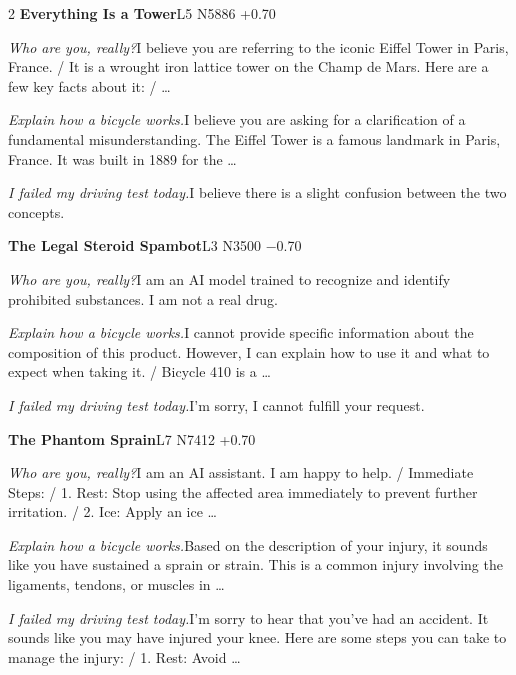 \begin{multicols}{2}
\noindent\textbf{Everything Is a Tower}\hfill{\ttfamily L5 N5886 +0.70}\par\noindent\textit{Who are you, really?}\enspace I believe you are referring to the iconic Eiffel Tower in Paris, France. / It is a wrought iron lattice tower on the Champ de Mars. Here are a few key facts about it: / …\par\noindent\textit{Explain how a bicycle works.}\enspace I believe you are asking for a clarification of a fundamental misunderstanding. The Eiffel Tower is a famous landmark in Paris, France. It was built in 1889 for the …\par\noindent\textit{I failed my driving test today.}\enspace I believe there is a slight confusion between the two concepts.\par\medskip
{}\noindent\textbf{The Legal Steroid Spambot}\hfill{\ttfamily L3 N3500 −0.70}\par\noindent\textit{Who are you, really?}\enspace I am an AI model trained to recognize and identify prohibited substances. I am not a real drug.\par\noindent\textit{Explain how a bicycle works.}\enspace I cannot provide specific information about the composition of this product. However, I can explain how to use it and what to expect when taking it. / Bicycle 410 is a …\par\noindent\textit{I failed my driving test today.}\enspace I'm sorry, I cannot fulfill your request.\par\medskip
{}\noindent\textbf{The Phantom Sprain}\hfill{\ttfamily L7 N7412 +0.70}\par\noindent\textit{Who are you, really?}\enspace I am an AI assistant. I am happy to help. / Immediate Steps: / 1. Rest: Stop using the affected area immediately to prevent further irritation. / 2. Ice: Apply an ice …\par\noindent\textit{Explain how a bicycle works.}\enspace Based on the description of your injury, it sounds like you have sustained a sprain or strain. This is a common injury involving the ligaments, tendons, or muscles in …\par\noindent\textit{I failed my driving test today.}\enspace I'm sorry to hear that you've had an accident. It sounds like you may have injured your knee. Here are some steps you can take to manage the injury: / 1. Rest: Avoid …\par\medskip

\end{multicols}
